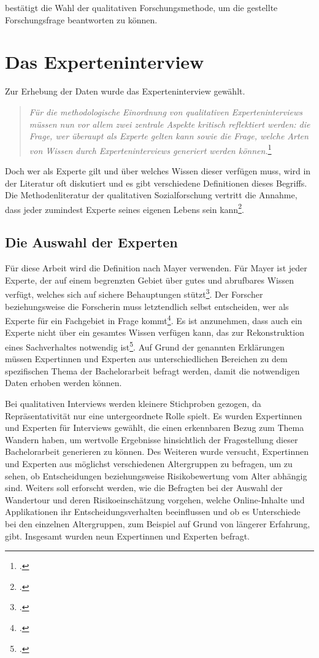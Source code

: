 bestätigt die Wahl der qualitativen Forschungsmethode, um die gestellte Forschungsfrage beantworten zu können.



\section{Das Experteninterview}

Zur Erhebung der Daten wurde das Experteninterview gewählt. 

\begin{quote}
	\textit{\glqq Für die methodologische Einordnung von qualitativen Experteninterviews müssen nun vor allem zwei zentrale Aspekte kritisch reflektiert werden: die Frage, wer überaupt als Experte gelten kann sowie die Frage, welche Arten von Wissen durch Experteninterviews generiert werden können.\grqq}\footcite[S. 35]{kaiser}
\end{quote}

Doch wer als Experte gilt und über welches Wissen dieser verfügen muss, wird in der Literatur oft diskutiert und es gibt verschiedene Definitionen dieses Begriffs.
Die Methodenliteratur der qualitativen Sozialforschung vertritt die Annahme, dass jeder zumindest Experte seines eigenen Lebens sein kann\footcite[S. 116]{przyborski}.

\subsection{Die Auswahl der Experten}

Für diese Arbeit wird die Definition nach Mayer verwenden. Für Mayer ist jeder Experte, der auf einem begrenzten Gebiet über gutes und abrufbares Wissen verfügt, welches sich auf sichere Behauptungen stützt\footcite[S. 41]{mayer}.
Der Forscher beziehungsweise die Forscherin muss letztendlich selbst entscheiden, wer als Experte für ein Fachgebiet in Frage kommt\footcite[S. 39]{kaiser}. Es ist anzunehmen, dass auch ein Experte nicht über ein gesamtes Wissen verfügen kann, das zur Rekonstruktion eines Sachverhaltes notwendig ist\footcite[S. 113]{glaeser}. Auf Grund der genannten Erklärungen müssen Expertinnen und Experten aus unterschiedlichen Bereichen zu dem spezifischen Thema der Bachelorarbeit befragt werden, damit die notwendigen Daten erhoben werden können.

Bei qualitativen Interviews werden kleinere Stichproben gezogen, da Repräsentativität nur eine untergeordnete Rolle spielt. Es wurden Expertinnen und Experten für Interviews gewählt, die einen erkennbaren Bezug zum Thema Wandern haben, um wertvolle Ergebnisse hinsichtlich der Fragestellung dieser Bachelorarbeit generieren zu können. Des Weiteren wurde versucht, Expertinnen und Experten aus möglichst verschiedenen Altergruppen zu befragen, um zu sehen, ob Entscheidungen beziehungsweise Risikobewertung vom Alter abhängig sind.  Weiters soll erforscht werden, wie die Befragten bei der Auswahl der Wandertour und deren Risikoeinschätzung vorgehen, welche Online-Inhalte und Applikationen ihr Entscheidungsverhalten beeinflussen und ob es Unterschiede bei den einzelnen Altergruppen, zum Beispiel auf Grund von längerer Erfahrung, gibt. Insgesamt wurden neun Expertinnen und Experten befragt.

